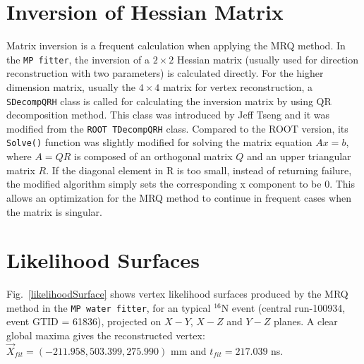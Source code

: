 \section{Inversion of Hessian Matrix}
Matrix inversion is a frequent calculation when applying the MRQ method. In the \texttt{MP fitter}, the inversion of a $2\times 2$ Hessian matrix (usually used for direction reconstruction with two parameters) is calculated directly. For the higher dimension matrix, usually the $4\times 4$ matrix for vertex reconstruction, a \texttt{SDecompQRH} class is called for calculating the inversion matrix by using QR decomposition method\cite{press2007numerical}. This class was introduced by Jeff Tseng and it was modified from the \texttt{ROOT TDecompQRH} class\cite{TDecompQRH}. Compared to the ROOT version, its \texttt{Solve()} function was slightly modified for solving the matrix equation $Ax=b$, where $A = QR$ is composed of an orthogonal matrix $Q$ and an upper triangular matrix $R$. If the diagonal element in R is too small, instead of returning failure, the modified algorithm simply sets the corresponding x component to be 0. This allows an optimization for the MRQ method to continue in frequent cases when the matrix is singular.

\section{Likelihood Surfaces}\label{appendix:likelihoodSurface}

Fig.~\ref{likelihoodSurface} shows vertex likelihood surfaces produced by the MRQ method in the \texttt{MP water fitter}, for an typical {$^{16}$}N event (central run-100934, event GTID = 61836), projected on $X-Y$, $X-Z$ and $Y-Z$ planes. A clear global maxima gives the reconstructed vertex: $\vec{X}_{fit}=(-211.958, 503.399, 275.990)$ mm and $t_{fit}=217.039$ ns. 

